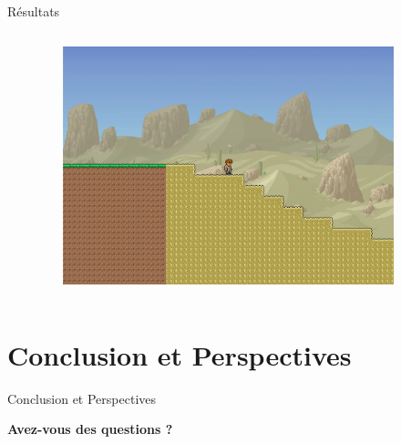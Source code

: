 \documentclass[aspectratio=169]{beamer}
\begin{document}
\begin{frame}{Résultats}
    \begin{columns}
        \centering
        \begin{column}{0.5\textwidth}
            \centering
            \lipsum[1][1-5]
        \end{column}
        \begin{column}{0.5\textwidth}
            \centering
            \begin{figure}
                \centering
                \captionsetup{format=sanslabel}
                \includegraphics[width=0.9\textwidth]{assets/background_1.png}
            \end{figure}
        \end{column}
    \end{columns}
\end{frame}


\section{Conclusion et Perspectives}

\begin{frame}{Conclusion et Perspectives}
    \centering
    \lipsum[1][1-5]
\end{frame}


\begin{frame}{}
    \centering
    \vfill
    \huge\textbf{Avez-vous des questions ?}
    \vfill
\end{frame}
\end{document}
